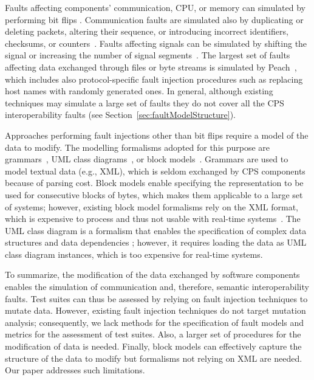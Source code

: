 Faults affecting components' communication, 
CPU, or memory can simulated by performing bit flips 
\cite{tsai1999stress,barton1990fault,han1995doctor,dawson1996testing}.
Communication faults are simulated also by duplicating or deleting packets, altering their sequence, or introducing incorrect identifiers, checksums, or counters~\cite{di2015evolutionary,di2015generating}.
Faults affecting signals can be simulated by shifting the signal or increasing the number of signal segments~\cite{Matinnejad19}.
The largest set of faults affecting data exchanged through files or byte streams is simulated by Peach~\cite{PeachFuzzer}, which includes also protocol-specific fault injection procedures such as replacing host names with randomly generated ones.
In general, although existing techniques may simulate a large set of faults they do not cover all the CPS interoperability faults (see Section~\ref{sec:faultModelStructure}).

Approaches performing fault injections other than bit flips require a model of the data to modify.
The modelling formalisms adopted for this purpose are grammars~\cite{ghosh1998testing,Godefroid:GrammarBasedFuzzying:2008,godefroid2012sage,bounimova2013billions}, UML class diagrams~\cite{di2015evolutionary,di2015generating}, or block models~\cite{pham2016model,PeachFuzzer}.
Grammars are used to model textual data (e.g., XML), which is seldom exchanged by CPS components because of parsing cost. 
Block models enable specifying the representation to be used for consecutive blocks of bytes, which makes them applicable to a large set of systems; however, existing block model formalisms rely on the XML format, which is expensive to process and thus not usable with real-time systems~\cite{pham2016model,PeachFuzzer}.
The UML class diagram is a formalism that
enables the specification of complex data structures and 
data dependencies 
\cite{di2015evolutionary,di2015generating}; however, it requires loading the data as UML class diagram instances, which is too expensive for real-time systems. 

To summarize, the modification of the data exchanged by software components enables the simulation of communication and, therefore, semantic interoperability faults.
Test suites can thus be assessed by relying on fault injection techniques to mutate data. 
However, existing fault injection techniques do not target mutation analysis; consequently, we lack methods for the specification of fault models and metrics for the assessment of test suites. 
Also, a larger set of procedures for the modification of data is needed.
Finally, block models can effectively capture the structure of the data to modify but formalisms not relying on XML are needed. Our paper addresses such limitations.


